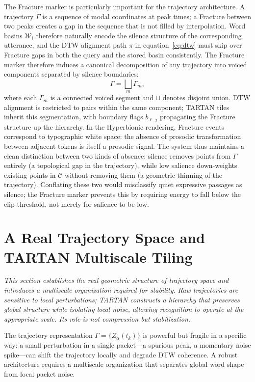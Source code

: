 \documentclass[12pt, a4paper]{article}
\begin{document}
The Fracture marker is particularly important for the trajectory architecture. A trajectory $\Gamma$ is a sequence of modal coordinates at peak times; a Fracture between two peaks creates a gap in the sequence that is not filled by interpolation. Word basins $\mathcal{W}_i$ therefore naturally encode the silence structure of the corresponding utterance, and the DTW alignment path $\pi$ in equation~\eqref{eq:dtw} must skip over Fracture gaps in both the query and the stored basin consistently. The Fracture marker therefore induces a canonical decomposition of any trajectory into voiced components separated by silence boundaries:
\begin{equation}
\Gamma = \bigsqcup_{m} \Gamma_m,
\label{eq:decomp}
\end{equation}
where each $\Gamma_m$ is a connected voiced segment and $\sqcup$ denotes disjoint union. DTW alignment is restricted to pairs within the same component; TARTAN tiles inherit this segmentation, with boundary flags $b_{\ell,j}$ propagating the Fracture structure up the hierarchy. In the Hyperbionic rendering, Fracture events correspond to typographic white space: the absence of prosodic transformation between adjacent tokens is itself a prosodic signal. The system thus maintains a clean distinction between two kinds of absence: silence removes points from $\Gamma$ entirely (a topological gap in the trajectory), while low salience down-weights existing points in $\mathcal{C}$ without removing them (a geometric thinning of the trajectory). Conflating these two would misclassify quiet expressive passages as silence; the Fracture marker prevents this by requiring energy to fall below the clip threshold, not merely for salience to be low.

\section{A Real Trajectory Space and TARTAN Multiscale Tiling}

\noindent\textit{This section establishes the real geometric structure of trajectory space and introduces a multiscale organization required for stability. Raw trajectories are sensitive to local perturbations; TARTAN constructs a hierarchy that preserves global structure while isolating local noise, allowing recognition to operate at the appropriate scale. Its role is not compression but stabilization.}


The trajectory representation $\Gamma = \{Z_\alpha(t_k)\}$ is powerful but fragile in a specific way: a small perturbation in a single packet---a spurious peak, a momentary noise spike---can shift the trajectory locally and degrade DTW coherence. A robust architecture requires a multiscale organization that separates global word shape from local packet noise.
\end{document}
